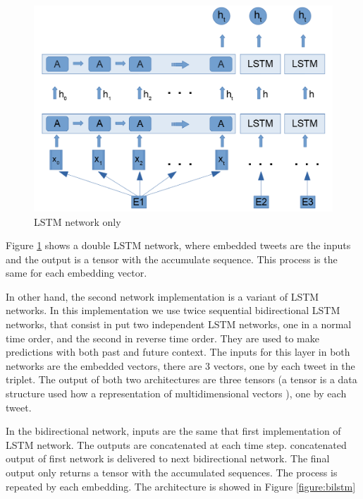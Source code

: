 \documentclass[12pt]{report}
\begin{document}
\begin{figure}[H]	
	\centering
	\includegraphics[width=150mm, scale = 1]{images/12_lstm_only.png}	
	\caption{LSTM network only}	
	\label{figure:lstm_only}
\end{figure}

Figure \ref{figure:lstm_only} shows a double \ac{LSTM} network, where embedded tweets are the inputs and the output is a tensor with the accumulate sequence. This process is the same for each embedding vector.

In other hand, the second network implementation is a variant of \ac{LSTM} networks. In this implementation we use twice sequential bidirectional LSTM networks, that consist in put two independent \ac{LSTM} networks, one in a normal time order, and the second in reverse time order. They are used to make predictions with both past and future context. The inputs for this layer in both networks are the embedded vectors, there are 3 vectors, one by each tweet in the triplet. The output of both two architectures are three tensors (a tensor is a data structure used how a representation of multidimensional vectors \cite{Tensor2019}), one by each tweet.

In the bidirectional network, inputs are the same that first implementation of \ac{LSTM} network. The outputs are concatenated at each time step. concatenated output of first network is delivered to next bidirectional network. The final output only returns a tensor with the accumulated sequences. The process is repeated by each embedding. The architecture is showed in Figure \ref{figure:bilstm}
\end{document}

